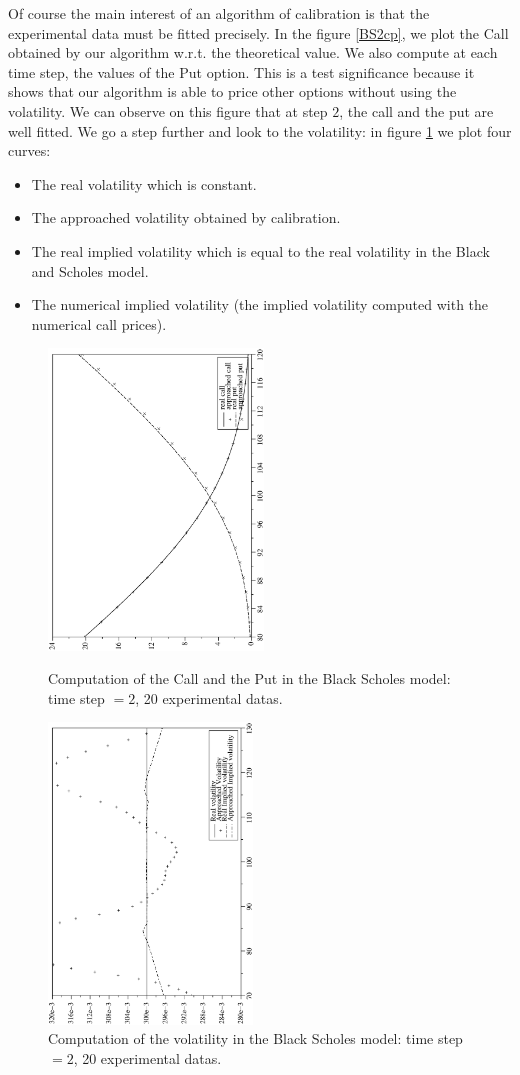 \documentclass[a4paper]{article}
\begin{document}
Of course the main interest of an algorithm of calibration is
that the experimental data must be fitted precisely. In the
figure \ref{BS2cp}, we plot the Call obtained by our algorithm
w.r.t. the theoretical value. We also compute at each time step,
the values of the Put option. This is a test significance because
it shows that our algorithm is able to price other options
without using the volatility. We can observe on this figure that
at step $2$, the call and the put are well fitted. We go a step
further and look to the volatility: in figure \ref{BS2vol} we
plot four curves:
\begin{itemize}
  \item The real volatility which is constant.
  \item The approached volatility obtained by calibration.
  \item The real implied volatility which is equal to the real
  volatility in the Black and Scholes model.
  \item The numerical implied volatility (the implied volatility
  computed with the numerical call prices).
\end{itemize}
\begin{figure}[tbp]
\begin{center}
\includegraphics[height=8cm,angle=270]{ArticlePS/20BS2CallPut.eps}
\caption{Computation of the Call and the Put in the Black Scholes
model: time step $=2$, 20 experimental datas.\label{BS2cp}}
\includegraphics[height=8cm,angle=270]{ArticlePS/20BS2Vol.eps}
\caption{Computation of the volatility in the Black Scholes model:
time step $=2$, 20 experimental datas.\label{BS2vol}}
\end{center}
\end{figure}
\end{document}
